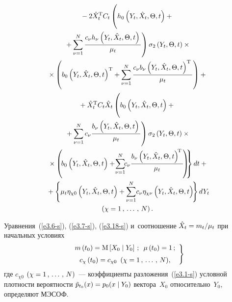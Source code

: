 \begin{multicols}{2}
\noindent
\begin{multline}
       {}-2 \hat X_t^{\mathrm{T}} C_t \left(
\vphantom{\fr{c_\nu h_\nu \left(Y_t,\hat X_t,\Theta,t\right)}{\mu_t}}
h_0 \left(Y_t,\hat X_t,\Theta,t\right)
    +{}\right.\\
\left.    {}+ \sss_{\nu=1}^N
    \fr{c_\nu h_\nu \left(Y_t,\hat X_t,\Theta,t\right)}{\mu_t}\right)
    \sigma_2 \left(Y_t,\Theta,t\right)\times{}\\
{}\times  \left( b_0 
\left(Y_t,\hat X_t,\Theta,t\right)^{\mathrm{T}} +\sss_{\nu=1}^N
   \fr{c_\nu b_\nu \left(Y_t,\hat X_t,\Theta,t\right)^{\mathrm{T}}}{\mu_t}\right)+{}\\
{}+\hat X_t^{\mathrm{T}} C_t \hat X_t \left( 
\vphantom{\fr{c_\nu h_\nu \left(Y_t,\hat X_t,\Theta,t\right)}{\mu_t}}
b_0 
\left(Y_t,\hat X_t,\Theta,t\right)+{}\right.\\
\left.{}+\sss_{\nu=1}^N c_\nu
   \fr{b_\nu \left(Y_t,\hat X_t,\Theta,t\right)}{\mu_t}\right)\sigma_2 \left(Y_t,\Theta,t\right)\times{}\\
\left.{}\times  \left( \!
b_0 \left(Y_t,\hat X_t,\Theta,t\right) +\!\sss_{\nu=1}^N \!\!c_\nu
\fr{b_\nu \left(Y_t,\hat X_t,\Theta,t\right)^{\!\mathrm{T}}}{\mu_t}\!\right)\!\! \right\} dt+{}\hspace*{-.57072pt}\\
{}+\left\{ \mu_t\eta_{\chi 0} \left(Y_t,\hat X_t,\Theta,t\right) +
 \sss_{\nu=1}^N \!c_\nu
    \eta_{\chi\nu} \left(Y_t,\hat X_t,\Theta,t\right)\!\right\}  dY_t\hspace*{-1.78561pt}\\
     (\chi =1\tr     N)\,.
    \label{e3.18-s}
    \end{multline}

Уравнения~(\ref{e3.6-s}), (\ref{e3.7-s}), (\ref{e3.18-s}) и~соотношение $\hat X_t
\hm= m_t/\mu_t$ при начальных условиях
\begin{equation}
\left.
\begin{array}{c}
m\left(t_0\right) =\mathrm{M}\left[ X_0\mid Y_0\right]\,;\enskip 
\mu\left(t_0\right) = 1\,;\\[6pt] 
c_\chi \left(t_0\right) =c_{\chi 0}\enskip (\chi =1\,,\,\ldots\,,\,  N),
\end{array}
\right\}
\label{e3.19-s}
\end{equation}
где $c_{\chi 0}$ $(\chi\hm=1\tr N)$~--- коэффициенты разложения~(\ref{e3.1-s}) 
условной плотности вероятности $\tilde p_{t_0} (x) \hm= p_0 (x\mid Y_0)$ 
вектора~$X_0$ относительно~$Y_0$, определяют
МЭСОФ.


\end{multicols}
